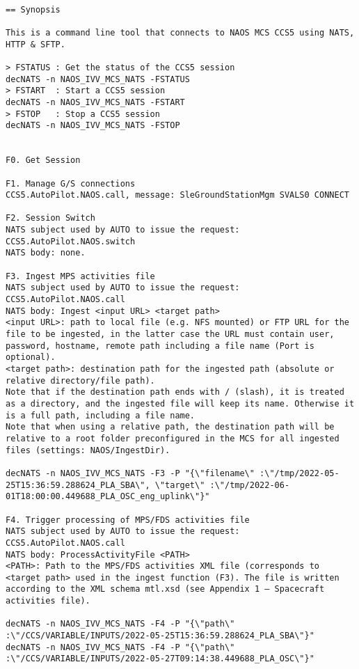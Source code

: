 \documentclass[dec_sum_main.tex]{subfiles}
\begin{document}
\begin{verbatim}

== Synopsis

This is a command line tool that connects to NAOS MCS CCS5 using NATS, HTTP & SFTP.

> FSTATUS : Get the status of the CCS5 session 
decNATS -n NAOS_IVV_MCS_NATS -FSTATUS
> FSTART  : Start a CCS5 session
decNATS -n NAOS_IVV_MCS_NATS -FSTART
> FSTOP   : Stop a CCS5 session
decNATS -n NAOS_IVV_MCS_NATS -FSTOP


F0. Get Session 

F1. Manage G/S connections
CCS5.AutoPilot.NAOS.call, message: SleGroundStationMgm SVALS0 CONNECT

F2. Session Switch
NATS subject used by AUTO to issue the request: CCS5.AutoPilot.NAOS.switch
NATS body: none.

F3. Ingest MPS activities file
NATS subject used by AUTO to issue the request: CCS5.AutoPilot.NAOS.call
NATS body: Ingest <input URL> <target path>
<input URL>: path to local file (e.g. NFS mounted) or FTP URL for the file to be ingested, in the latter case the URL must contain user, password, hostname, remote path including a file name (Port is optional).
<target path>: destination path for the ingested path (absolute or relative directory/file path).
Note that if the destination path ends with / (slash), it is treated as a directory, and the ingested file will keep its name. Otherwise it is a full path, including a file name.
Note that when using a relative path, the destination path will be relative to a root folder preconfigured in the MCS for all ingested files (settings: NAOS/IngestDir).

decNATS -n NAOS_IVV_MCS_NATS -F3 -P "{\"filename\" :\"/tmp/2022-05-25T15:36:59.288624_PLA_SBA\", \"target\" :\"/tmp/2022-06-01T18:00:00.449688_PLA_OSC_eng_uplink\"}"

F4. Trigger processing of MPS/FDS activities file
NATS subject used by AUTO to issue the request: CCS5.AutoPilot.NAOS.call
NATS body: ProcessActivityFile <PATH>
<PATH>: Path to the MPS/FDS activities XML file (corresponds to <target path> used in the ingest function (F3). The file is written according to the XML schema mtl.xsd (see Appendix 1 – Spacecraft activities file).

decNATS -n NAOS_IVV_MCS_NATS -F4 -P "{\"path\" :\"/CCS/VARIABLE/INPUTS/2022-05-25T15:36:59.288624_PLA_SBA\"}"
decNATS -n NAOS_IVV_MCS_NATS -F4 -P "{\"path\" :\"/CCS/VARIABLE/INPUTS/2022-05-27T09:14:38.449688_PLA_OSC\"}"


\end{verbatim}
\end{document}
